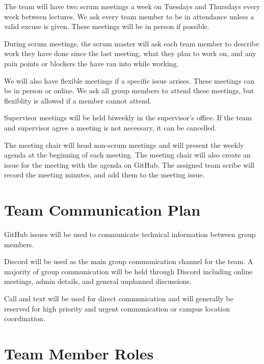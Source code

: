 \documentclass{article}
\begin{document}
The team will have two scrum meetings a week on Tuesdays and Thursdays every week
between lectures. We ask every team member to be in attendance unless a valid
excuse is given. These meetings will be in person if possible.\newline

During scrum meetings, the scrum master will ask each team member to describe
work they have done since the last meeting, what they plan to work on, and any
pain points or blockers the have ran into while working.\newline

We will also have flexible meetings if a specific issue arrises. These meetings can be in
person or online. We ask all group members to attend these meetings, but
flexiblity is allowed if a member cannot attend.\newline

Supervisor meetings will be held biweekly in the supervisor's office. If the
team and supervisor agree a meeting is not necessary, it can be cancelled.
\newline

The meeting chair will head non-scrum meetings and will present the weekly
agenda at the beginning of each meeting. The meeting chair will also create an
issue for the meeting with the agenda on GitHub. The assigned team scribe will
record the meeting minutes, and add them to the meeting issue.

\section{Team Communication Plan}

GitHub issues will be used to communicate technical information 
between group members.\newline

Discord will be used as the main group communication channel for the team. A majority 
of group communication will be held through Discord including online meetings, admin details, 
and general unplanned discussions.\newline

Call and text will be used for direct communication
and will generally be reserved for high priority and urgent communication or 
campus location coordination. 

\section{Team Member Roles}
\end{document}
